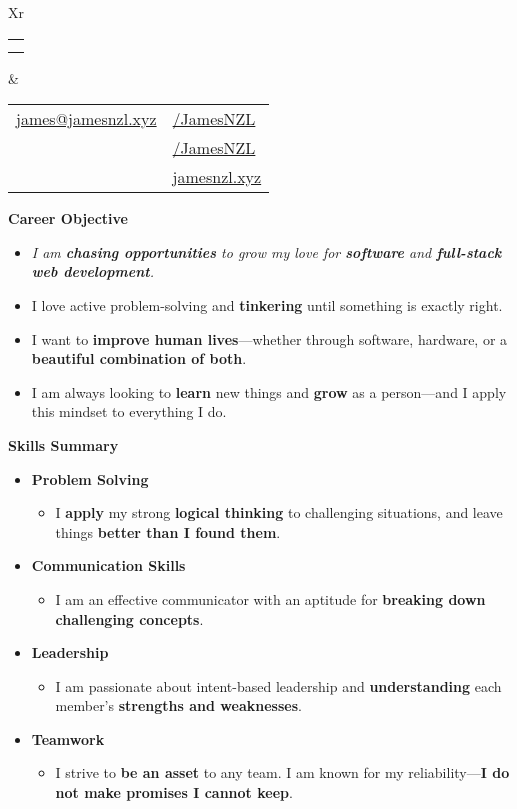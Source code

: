 \documentclass[11pt,a4paper]{article}[leftmargin=*]
\makeatletter
\def \fullname {James Bao}
\def \subtitle {}
\def \emailicon {\faAt}
\def \emaillink {mailto:james@jamesnzl.xyz}
\def \emailtext {james@jamesnzl.xyz}
\def \phoneicon {\faMobile}
\def \phonetext {+64 22 410 1580}
\def \addressicon {\faHome}
\def \addresstext {Auckland, New Zealand}
\def \linkedinicon {\faLinkedin}
\def \linkedinlink {https://www.linkedin.com/in/jamesnzl/}
\def \linkedintext {/JamesNZL}
\def \githubicon {\faGithub}
\def \githublink {https://github.com/jamesnzl}
\def \githubtext {/JamesNZL}
\def \websiteicon {\faGlobe}
\def \websitelink {https://jamesnzl.xyz/}
\def \websitetext {jamesnzl.xyz}
\def \headertype {\doublecol} %
\def \entryspacing {-0pt}
\def \email {\hspace{0.06em}\emailicon \hspace{3pt}\href{\emaillink}{\emailtext}}
\def \phone {\hspace{0.24em}\phoneicon \hspace{3pt}{ \phonetext}}
\def \address {\addressicon \hspace{3pt}{\addresstext}}
\def \linkedin {\linkedinicon \hspace{3pt}\href{\linkedinlink}{\linkedintext}}
\def \github {\githubicon \hspace{3pt}\href{\githublink}{\githubtext}}
\def \website {\websiteicon \hspace{3pt}\href{\websitelink}{\websitetext}}
\renewcommand{\section}[2]{\vspace{5pt}
  \colorbox{secondary}{\color{white}\raggedbottom\normalsize\textbf{{#1}{\hspace{7pt}#2}}}
}
\newcommand{\resumeEntryStart}{\begin{itemize}[leftmargin=2.5mm]}
\newcommand{\resumeEntryEnd}{\end{itemize}\vspace{\entryspacing}}
\newcommand{\resumeItemListStart}{\begin{itemize}[leftmargin=4.5mm]}
\newcommand{\resumeItemListEnd}{\end{itemize}}
\newcommand{\resumeItem}[1]{
  \item\small{
    {#1 \vspace{-2pt}}
  }
}
\newcommand{\resumeEntryS}[2]{
  \item[]\small{
    \textbf{\color{primary}#1 }{ #2 \vspace{-4pt}}
  }
}
\newcommand{\resumeEntryE}[1]{
  \item[]\small{
    \textit{\color{accent}\small#1 \vspace{-6pt}}
  }\\
}
\newcommand{\resumeEntryP}[1]{
  \item[]\small{
    #1 \vspace{-6pt}
  }\\
}
\newcommand{\resumeBf}[1]{\small\textbf{\color{halfbold}#1}}
\newcommand{\doublecol}[6]{
  \begin{tabularx}{\textwidth}{Xr}
    {
      \begin{tabular}[c]{l}
        \fontsize{35}{45}\selectfont{\color{primary}{{\textbf{\fullname}}}} \\
        {\textit{\subtitle}} %
      \end{tabular}
    } & {
      \begin{tabular}[c]{l@{\hspace{1.5em}}l}
        {\small#4} & {\small#1} \\
        {\small#5} & {\small#2} \\
        {\small#6} & {\small#3}
      \end{tabular}
    }
  \end{tabularx}
}
\newcommand{\singlecol}[6]{
  \begin{tabularx}{\textwidth}{Xr}
    {
      \begin{tabular}[b]{l}
        \fontsize{35}{45}\selectfont{\color{primary}{{\textbf{\fullname}}}} \\
        {\textit{\subtitle}} %
      \end{tabular}
    } & {
      \begin{tabular}[c]{l}
        {\small#1} \\
        {\small#2} \\
        {\small#3} \\
        {\small#4} \\
        {\small#5} \\
        {\small#6}
      \end{tabular}
    }
  \end{tabularx}
}
\makeatother
\begin{document}

\headertype{\linkedin}{\github}{\website}{\email}{\phone}{\address} %
\vspace{-10pt} %


\section{\faCrosshairs}{Career Objective}

\resumeEntryStart
\resumeEntryE{I am \resumeBf{chasing opportunities} to grow my love for \resumeBf{software} and \resumeBf{full-stack web development}.}

\resumeEntryP{I love active problem-solving and \resumeBf{tinkering} until something is exactly right.}

\resumeEntryP{I want to \resumeBf{improve human lives}---whether through software, hardware, or a \resumeBf{beautiful combination of both}.}

\resumeEntryP{I am always looking to \resumeBf{learn} new things and \resumeBf{grow} as a person—and I apply this mindset to everything I do.}
\resumeEntryEnd


\section{\faAngleDoubleUp}{Skills Summary}

\resumeEntryStart
\resumeEntryS{Problem Solving}{}
\resumeItemListStart
\resumeItem{
  I \resumeBf{apply} my strong \resumeBf{logical thinking} to challenging situations, and leave things \resumeBf{better than I found them}.
}
\resumeItemListEnd

\resumeEntryS{Communication Skills}{}
\resumeItemListStart
\resumeItem{
  I am an effective communicator with an aptitude for \resumeBf{breaking down challenging concepts}.
}
\resumeItemListEnd

\resumeEntryS{Leadership}{}
\resumeItemListStart
\resumeItem{
  I am passionate about intent-based leadership and \resumeBf{understanding} each member's \resumeBf{strengths and weaknesses}.
}
\resumeItemListEnd

\resumeEntryS{Teamwork}{}
\resumeItemListStart
\resumeItem{
  I strive to \resumeBf{be an asset} to any team. I am known for my reliability---\resumeBf{I do not make promises I cannot keep}.
}
\resumeItemListEnd
\resumeEntryEnd
\end{document}
